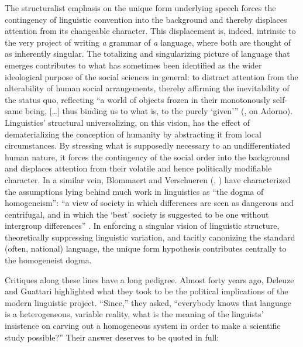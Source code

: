\documentclass[output=paper]{langscibook}
\begin{document}
The structuralist emphasis on the unique form underlying speech forces the contingency of linguistic convention into the background and thereby displaces attention from its changeable character. This displacement is, indeed, intrinsic to the very project of writing \emph{a} grammar of \emph{a} language, where both are thought of as inherently singular. The totalizing and singularizing picture of language that emerges contributes to what has sometimes been identified as the wider ideological purpose of the social sciences in general: to distract attention from the alterability of human social arrangements, thereby affirming the inevitability of the status quo, reflecting ``a world of objects frozen in their monotonously self-same being, […] thus binding us to what is, to the purely `given'\thinspace'' (\citealt[126]{Eagleton1991}, on Adorno). Linguistics' structural universalizing, on this vision, has the effect of dematerializing the conception of humanity by abstracting it from local circumstances. By stressing what is supposedly necessary to an undifferentiated human nature, it forces the contingency of the social order into the background and displaces attention from their volatile and hence politically modifiable character. In a similar vein, Blommaert and Verschueren (\citeyear{BlommaertVerschueren1991}, \citeyear{BlommaertVerschueren1992}) have characterized the assumptions lying behind much work in linguistics as ``the dogma of homogeneism'': ``a view of society in which differences are seen as dangerous and centrifugal, and in which the `best' society is suggested to be one without intergroup differences'' \citep[362]{BlommaertVerschueren1992}. In enforcing a singular vision of linguistic structure, theoretically suppressing linguistic variation, and tacitly canonizing the standard (often, national) language, the unique form hypothesis contributes centrally to the homogeneist dogma.

Critiques along these lines have a long pedigree. Almost forty years ago, Deleuze and Guattari highlighted what they took to be the political implications of the modern linguistic project. ``Since,'' they asked, ``everybody knows that language is a heterogeneous, variable reality, what is the meaning of the linguists' insistence on carving out a homogeneous system in order to make a scientific study possible?'' Their answer deserves to be quoted in full:
\end{document}
